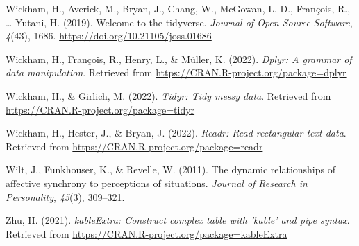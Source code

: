 \documentclass[
  english,
  man]{apa6}
\newlength{\cslhangindent}
\newlength{\cslentryspacingunit} %
\newenvironment{CSLReferences}[2] %
 {%
  \setlength{\parindent}{0pt}
  \ifodd #1
  \let\oldpar\par
  \def\par{\hangindent=\cslhangindent\oldpar}
  \fi
  \setlength{\parskip}{#2\cslentryspacingunit}
 }%
 {}
\begin{document}
\begin{CSLReferences}{1}{0}
\leavevmode{}%
Wickham, H., Averick, M., Bryan, J., Chang, W., McGowan, L. D., François, R., \ldots{} Yutani, H. (2019). Welcome to the {tidyverse}. \emph{Journal of Open Source Software}, \emph{4}(43), 1686. \url{https://doi.org/10.21105/joss.01686}

\leavevmode{}%
Wickham, H., François, R., Henry, L., \& Müller, K. (2022). \emph{Dplyr: A grammar of data manipulation}. Retrieved from \url{https://CRAN.R-project.org/package=dplyr}

\leavevmode{}%
Wickham, H., \& Girlich, M. (2022). \emph{Tidyr: Tidy messy data}. Retrieved from \url{https://CRAN.R-project.org/package=tidyr}

\leavevmode{}%
Wickham, H., Hester, J., \& Bryan, J. (2022). \emph{Readr: Read rectangular text data}. Retrieved from \url{https://CRAN.R-project.org/package=readr}

\leavevmode{}%
Wilt, J., Funkhouser, K., \& Revelle, W. (2011). The dynamic relationships of affective synchrony to perceptions of situations. \emph{Journal of Research in Personality}, \emph{45}(3), 309--321.

\leavevmode{}%
Zhu, H. (2021). \emph{kableExtra: Construct complex table with 'kable' and pipe syntax}. Retrieved from \url{https://CRAN.R-project.org/package=kableExtra}

\end{CSLReferences}

\endgroup
\end{document}
